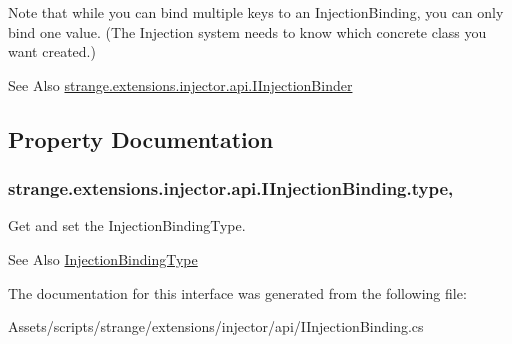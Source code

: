 Note that while you can bind multiple keys to an Injection\-Binding, you can only bind one value. (The Injection system needs to know which concrete class you want created.)

\begin{DoxySeeAlso}{See Also}
\hyperlink{interfacestrange_1_1extensions_1_1injector_1_1api_1_1_i_injection_binder}{strange.\-extensions.\-injector.\-api.\-I\-Injection\-Binder} 
\end{DoxySeeAlso}


\subsection{Property Documentation}
\hypertarget{interfacestrange_1_1extensions_1_1injector_1_1api_1_1_i_injection_binding_ab79532f96a6a17f831559143066fed78}{
\subsubsection[{type}]{ strange.\-extensions.\-injector.\-api.\-I\-Injection\-Binding.\-type\hspace{0.3cm}{\ttfamily [get]}, {\ttfamily [set]}}}\label{interfacestrange_1_1extensions_1_1injector_1_1api_1_1_i_injection_binding_ab79532f96a6a17f831559143066fed78}


Get and set the Injection\-Binding\-Type. 

\begin{DoxySeeAlso}{See Also}
\hyperlink{namespacestrange_1_1extensions_1_1injector_1_1api_aaf5414484d7eccb5c502984bd70549ae}{Injection\-Binding\-Type} 
\end{DoxySeeAlso}


The documentation for this interface was generated from the following file\-:\begin{DoxyCompactItemize}
\item 
Assets/scripts/strange/extensions/injector/api/I\-Injection\-Binding.\-cs\end{DoxyCompactItemize}
